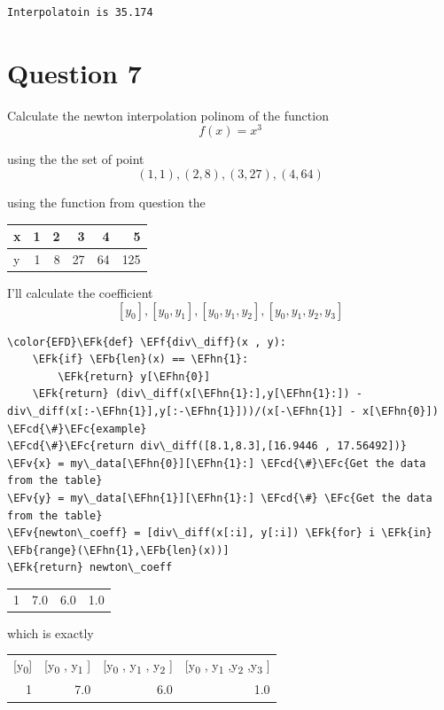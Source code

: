 \documentclass[11pt]{article}
\newcommand{\EFc}[1]{\textcolor{EFc}{#1}} %
\newcommand{\EFcd}[1]{\textcolor{EFcd}{#1}} %
\newcommand{\EFk}[1]{\textcolor{EFk}{#1}} %
\newcommand{\EFb}[1]{\textcolor{EFb}{#1}} %
\newcommand{\EFf}[1]{\textcolor{EFf}{#1}} %
\newcommand{\EFv}[1]{\textcolor{EFv}{#1}} %
\newcommand{\EFhn}[1]{\textcolor{EFhn}{#1}} %
\begin{document}
\begin{verbatim}
Interpolatoin is 35.174
\end{verbatim}

\newpage
\section{Question 7}
\label{sec:org81ccd41}
Calculate the newton interpolation polinom of the function
\[ f(x) = x^3 \]

using the the set of point
\[ (1,1),(2,8),(3,27),(4,64)  \]

using the function from question the

\begin{table}[htbp]
\label{data_question7}
\centering
\begin{tabular}{lrrrrr}
\hline
x & 1 & 2 & 3 & 4 & 5\\
\hline
y & 1 & 8 & 27 & 64 & 125\\
\hline
\end{tabular}
\end{table}

I'll calculate the coefficient
\[ [y_0] , [y_0 , y_1] , [y_0 , y_1,y_2] , [y_0 , y_1 , y_2 , y_3]  \]


\begin{Code}
\begin{Verbatim}
\color{EFD}\EFk{def} \EFf{div\_diff}(x , y):
    \EFk{if} \EFb{len}(x) == \EFhn{1}:
        \EFk{return} y[\EFhn{0}]
    \EFk{return} (div\_diff(x[\EFhn{1}:],y[\EFhn{1}:]) - div\_diff(x[:-\EFhn{1}],y[:-\EFhn{1}]))/(x[-\EFhn{1}] - x[\EFhn{0}])
\EFcd{\#}\EFc{example}
\EFcd{\#}\EFc{return div\_diff([8.1,8.3],[16.9446 , 17.56492])}
\EFv{x} = my\_data[\EFhn{0}][\EFhn{1}:] \EFcd{\#}\EFc{Get the data from the table}
\EFv{y} = my\_data[\EFhn{1}][\EFhn{1}:] \EFcd{\#} \EFc{Get the data from the table}
\EFv{newton\_coeff} = [div\_diff(x[:i], y[:i]) \EFk{for} i \EFk{in} \EFb{range}(\EFhn{1},\EFb{len}(x))]
\EFk{return} newton\_coeff
\end{Verbatim}
\end{Code}

\begin{center}
\begin{tabular}{rrrr}
1 & 7.0 & 6.0 & 1.0\\
\end{tabular}
\end{center}

which is exactly
\begin{center}
\begin{tabular}{rrrr}
\hline
{[}y\textsubscript{0}] & {[}y\textsubscript{0} , y\textsubscript{1} ] & {[}y\textsubscript{0} , y\textsubscript{1} , y\textsubscript{2} ] & {[}y\textsubscript{0} , y\textsubscript{1} ,y\textsubscript{2} ,y\textsubscript{3} ]\\
1 & 7.0 & 6.0 & 1.0\\
\hline
\end{tabular}
\end{center}
\end{document}
